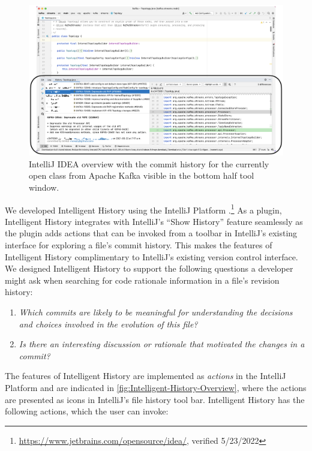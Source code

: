 \begin{figure}
    \includegraphics[width=\textwidth]{./images/intellij-overview.png}
    \caption{
        IntelliJ IDEA overview with the commit history for the currently open  class from Apache Kafka visible in the bottom half tool window.
    }
    \label{fig:IntelliJ-Overview}
\end{figure}

We developed Intelligent History using the IntelliJ Platform .\footnote{\url{https://www.jetbrains.com/opensource/idea/}, verified 5/23/2022}
As a plugin, Intelligent History integrates with IntelliJ's ``Show History'' feature seamlessly as the plugin adds actions that can be invoked from a toolbar in IntelliJ's existing interface for exploring a file's commit history. 
This makes the features of Intelligent History complimentary to IntelliJ's existing version control interface.
We designed Intelligent History to support the following questions a developer might ask when searching for code rationale information in a file's revision history:

\begin{enumerate}[label={(\arabic*)}]
    \item \textit{Which commits are likely to be meaningful for understanding the decisions and choices involved in the evolution of this file?}
    \item \textit{Is there an interesting discussion or rationale that motivated the changes in a commit?}
\end{enumerate}

The features of Intelligent History are implemented as \emph{actions} in the IntelliJ Platform  and are indicated in \autoref{fig:Intelligent-History-Overview}, where the actions are presented as icons in IntelliJ's  file history tool bar.
Intelligent History has the following actions, which the user can invoke:

